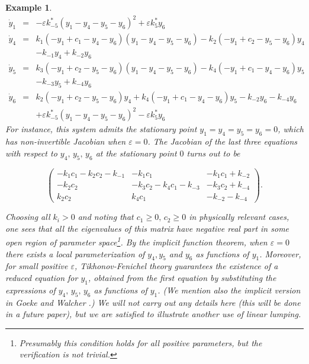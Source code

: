 \documentclass{article}
\newtheorem{example}{Example}
\begin{document}
\begin{example}
{\[\begin{array}{rcl}
            \dot y_1&=& -\varepsilon k_{-5}^* (y_1 - y_4 - y_5 - y_6)^2  + \varepsilon k_5^* y_6\\      
        \dot y_4&=& k_1 (-y_1 + c_1 - y_4 - y_6) (y_1 - y_4 - y_5 - y_6)
        - k_2 (-y_1 + c_2 - y_5 - y_6) y_4 \\
        &&- k_{-1} y_4 + k_{-2} y_6\\
     \dot y_5&=& k_3 (-y_1 + c_2 - y_5 - y_6) (y_1 - y_4 - y_5 - y_6)
        - k_4 (-y_1 + c_1 - y_4 - y_6) y_5\\
        &&- k_{-3} y_5 + k_{-4} y_6\\
      \dot y_6&=&k_2 (-y_1 + c_2 - y_5 - y_6) y_4
   + k_4 (-y_1 + c_1 - y_4 - y_6) y_5 - k_{-2} y_6 - k_{-4} y_6\\
        &&+ \varepsilon k_{-5}^* (y_1 - y_4 - y_5 - y_6)^2 
   - \varepsilon k_5^* y_6 
   \end{array}
\]
For instance, this system admits the stationary point $y_1=y_4=y_5=y_6=0$, which has non-invertible Jacobian when $\varepsilon=0$. The Jacobian of the last three equations with respect to $y_4,\,y_5,\,y_6$ at the stationary point $0$ turns out to be 

\[
\begin{pmatrix}
    -k_1c_1-k_2c_2-k_{-1}& -k_1c_1& -k_1c_1+k_{-2}\\
    -k_2c_2& -k_3c_2-k_4c_1-k_{-3}& -k_3c_2+k_{-4}\\
    k_2c_2&k_4c_1& -k_{-2}-k_{-4}
\end{pmatrix}.
\]

Choosing all $k_i>0$ and noting that $c_1\geq 0,\,c_2\geq 0$ in physically relevant cases, one sees that all the eigenvalues of this matrix have negative real part in some open region of parameter space\footnote{Presumably this condition holds for all positive parameters, but the verification is not trivial.}. By the implicit function theorem, when $\varepsilon=0$  there exists a local parameterization  of $y_4, y_5$ and $y_6$ as functions of $y_1$. Moreover, for small positive $\varepsilon$, Tikhonov-Fenichel theory guarantees the existence of a reduced equation for $y_1$, obtained from the first equation by substituting the expressions of $y_4,\,y_5,\,y_6$ as functions of $y_1$. (We mention also the implicit version in Goeke and Walcher \cite{gw2}.) We will not carry out any details here (this will be done in a future paper), but we are satisfied to illustrate another use of linear lumping.}
\end{example}
\end{document}
